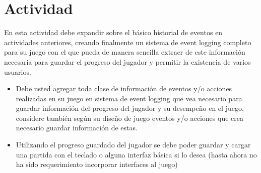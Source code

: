 \section{Actividad}
En esta actividad debe expandir sobre el básico historial de eventos en actividades anteriores, creando finalmente un sistema de event logging completo para su juego con el que pueda de manera sencilla extraer de este información necesaria para guardar el progreso del jugador y permitir la existencia de varios usuarios.
\begin{itemize}
\item Debe usted agregar toda clase de información de eventos y/o acciones realizadas en su juego en sistema de event logging que vea necesario para guardar información del progreso del jugador y su desempeño en el juego, considere también según su diseño de juego eventos y/o acciones que crea necesario guardar información de estas.
\item Utilizando el progreso guardado del jugador se debe poder guardar y cargar una partida con el teclado o alguna interfaz básica si lo desea (hasta ahora no ha sido requerimiento incorporar interfaces al juego)
\end{itemize}